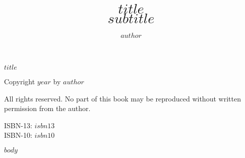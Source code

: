 \documentclass[11pt]{memoir}
\makeatletter
\newcommand{\verbatimfont}[1]{\def\verbatim@font{#1}}%
\makeatother
\begin{document}
\verbatimfont{\fontfamily{beramono}\ttfamily\footnotesize\selectfont}

\sloppybottom %
\pagestyle{Ruled}
\renewcommand\chaptermark[1]{%
  \markboth{\MakeUppercase{#1}}{}
}
\frontmatter

%

\title{\HUGE\textbf{\textsf{$title$}}\\ \vspace*{10pt} \Large \textit{$subtitle$}}

\author{$author$}
\date{}

\maketitle

\pagebreak
\vfill

\noindent
{\Large{\textbf{\textsc{$title$}}}}\\
\begin{small}
Copyright \textcopyright $year$ by $author$
\vspace{.5cm}

\noindent
All rights reserved.
No part of this book may be reproduced without written permission from the author.

\vspace{20pt}

\noindent
ISBN-13: $isbn13$\\
ISBN-10: $isbn10$

\vspace{20pt}


\vspace{30pt}



\vfill

\end{small}

\thispagestyle{empty}


\pagebreak

\clearpage
\tableofcontents*
\clearpage



%

\mainmatter


$body$ 




\end{document}
